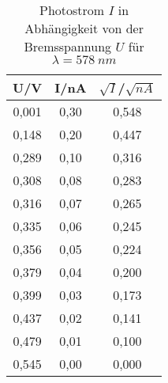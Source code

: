 \begin{table}[h!]
  \centering
  \caption{Photostrom $I$ in Abhängigkeit von der Bremsspannung $U$ für $\lambda=\SI{578}{nm}$}
  \label{tab:o578}
  \begin{tabular}{c c c}
    \midrule
      U/V & I/nA  & $\sqrt{I}$/$\sqrt{nA}$ \\
    \midrule
      0,001 & 0,30 & 0,548\\
      0,148 & 0,20 & 0,447\\
      0,289 & 0,10 & 0,316\\
      0,308 & 0,08 & 0,283\\
      0,316 & 0,07 & 0,265\\
      0,335 & 0,06 & 0,245\\
      0,356 & 0,05 & 0,224\\
      0,379 & 0,04 & 0,200\\
      0,399 & 0,03 & 0,173\\
      0,437 & 0,02 & 0,141\\
      0,479 & 0,01 & 0,100\\
      0,545 & 0,00 & 0,000\\


    \bottomrule
  \end{tabular}
\end{table}
